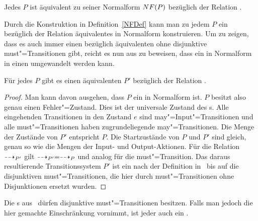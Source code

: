 \begin{Prop}[Normalform]
  Jedes \MEIO{} $P$ ist äquivalent zu seiner Normalform $NF (P)$ bezüglich
  der Relation \ERel{}.
\end{Prop}

Durch die Konstruktion in Definition~\ref{NFDef} kann man zu jedem \MEIO{} $P$
ein bezüglich der Relation \ERel{} äquivalentes \MEIO{} in Normalform
konstruieren. Um zu zeigen, dass es auch immer einen bezüglich \ERel{}
äquivalenten \MIA{} ohne disjunktive must"=Transitionen gibt, reicht es nun
aus zu beweisen, dass ein \MEIO{} in Normalform in einen \MIA{} umgewandelt
werden kann.

\begin{Satz}
  Für jedes \MEIO{} $P$ gibt es einen äquivalenten \MIA{} $P'$ bezüglich der
  Relation \ERel{}.
\end{Satz}
\begin{proof}
  Man kann \oBdA{} davon ausgehen, dass $P$ ein \MEIO{} in Normalform ist. $P$
  besitzt also genau einen Fehler"=Zustand. Dies ist der universale Zustand des
  \MIA{}s. Alle eingehenden Transitionen in den Zustand $e$ sind
  may"=Input"=Transitionen und alle must"=Transitionen haben zugrundeliegende
  may"=Transitionen. Die Menge der Zustände von $P'$ entspricht $P$. Die
  Startzustände von $P$ und $P'$ sind gleich, genau so wie die Mengen der
  Input- und Output-Aktionen. Für die Relation $\may _{P'}$ gilt $\may _{P'} =
  \may _{P}$ und analog für die must"=Transition. Das daraus resultierende
  Transitionssystem $P'$ ist ein \MIA{} nach der Definition
  in~\cite{Vogler2016MIA3} bis auf die disjunktiven must"=Transitionen, die
  hier durch must"=Transitionen ohne Disjunktionen ersetzt wurden.
\end{proof}

Die \MIA{}s aus~\cite{Vogler2016MIA3} dürfen disjunktive must"=Transitionen
besitzen. Falls man jedoch die hier gemachte Einschränkung vornimmt, ist jeder
\MIA{} auch ein \MEIO{}.
